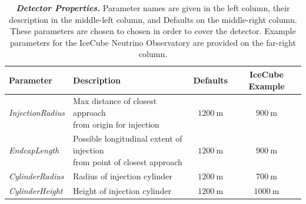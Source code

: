 \documentclass[main.tex]{subfiles}
\begin{document}
\begin{table}[]
    \begin{tabular}{l l c c }
        \toprule
        Parameter & Description & Defaults & IceCube Example\\
        \midrule
        \textit{InjectionRadius} & \makecell[l]{Max distance of closest approach\\from origin for injection}  & $\SI{1200}\m$ & $\SI{900}\m$ \\
        \textit{EndcapLength}    & \makecell[l]{Possible longitudinal extent of injection\\from point of closest approach} & $\SI{1200}\m$ & $\SI{900}\m$ \\[10pt]
        \textit{CylinderRadius}  & Radius of injection cylinder & $\SI{1200}\m$ & $\SI{700}\m$ \\
        \textit{CylinderHeight}  & Height of injection cylinder & $\SI{1200}\m$ & $\SI{1000}\m$ \\
        \bottomrule
    \end{tabular}
    \caption{\textbf{\textit{Detector Properties.}}
    Parameter names are given in the left column, their description in the middle-left column, and Defaults on the middle-right column. 
    These parameters are chosen to chosen in order to cover the detector. Example parameters for the IceCube Neutrino Observatory are provided on the far-right column.
    }
    \label{tbl:injection_defaults}
\end{table}
\end{document}
